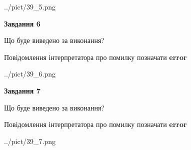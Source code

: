 \documentclass[10pt, ukrainian]{article}
\begin{document}
{\begin {large}
\begin{center}
	{../pict/39_5.png}
\end{center}
\newpage

{\begin {center}\textbf{Завдання 6}\end {center}}\par
Що буде виведено за виконання? \par
Повідомлення інтерпретатора про помилку позначати \textbf{error}

\begin{center}
	{../pict/39_6.png}
\end{center}
\newpage

{\begin {center}\textbf{Завдання 7}\end {center}}\par
Що буде виведено за виконання? \par
Повідомлення інтерпретатора про помилку позначати \textbf{error}

\begin{center}
	{../pict/39_7.png}
\end{center}
\newpage

\end {large}}
\end{document}
